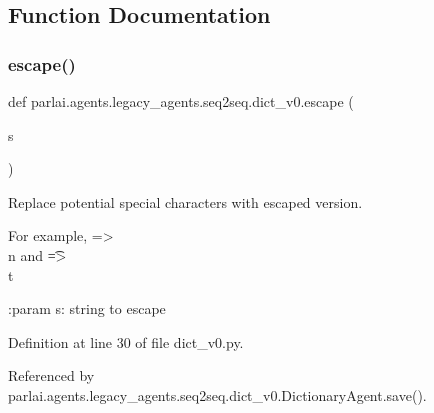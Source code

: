 \subsection{Function Documentation}
\mbox{\label{namespaceparlai_1_1agents_1_1legacy__agents_1_1seq2seq_1_1dict__v0_a50d891f5daa90cde2858723889ab0cc8}} 
\subsubsection{\texorpdfstring{escape()}{escape()}}
{\footnotesize\ttfamily def parlai.\+agents.\+legacy\+\_\+agents.\+seq2seq.\+dict\+\_\+v0.\+escape (\begin{DoxyParamCaption}\item[{}]{s }\end{DoxyParamCaption})}

\begin{DoxyVerb}Replace potential special characters with escaped version.

For example, \n => \\n and \t => \\t

:param s: string to escape
\end{DoxyVerb}
 

Definition at line 30 of file dict\+\_\+v0.\+py.



Referenced by parlai.\+agents.\+legacy\+\_\+agents.\+seq2seq.\+dict\+\_\+v0.\+Dictionary\+Agent.\+save().


